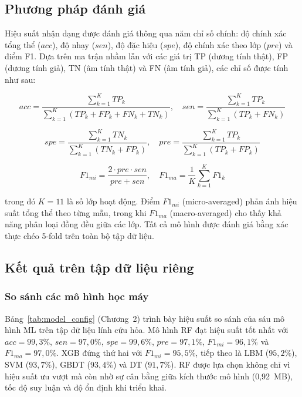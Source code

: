 \label{results_and_discussion}

\subsection{Phương pháp đánh giá}

Hiệu suất nhận dạng được đánh giá thông qua năm chỉ số chính: độ chính xác tổng thể ($acc$), độ nhạy ($sen$), độ đặc hiệu ($spe$), độ chính xác theo lớp ($pre$) và điểm F1. Dựa trên ma trận nhầm lẫn với các giá trị TP (dương tính thật), FP (dương tính giả), TN (âm tính thật) và FN (âm tính giả), các chỉ số được tính như sau:

\begin{equation}
acc = \frac{\sum_{k=1}^{K} TP_k}{\sum_{k=1}^{K} (TP_k + FP_k + FN_k + TN_k)}, \quad
sen = \frac{\sum_{k=1}^{K} TP_k}{\sum_{k=1}^{K} (TP_k + FN_k)}
\end{equation}

\begin{equation}
spe = \frac{\sum_{k=1}^{K} TN_k}{\sum_{k=1}^{K} (TN_k + FP_k)}, \quad
pre = \frac{\sum_{k=1}^{K} TP_k}{\sum_{k=1}^{K} (TP_k + FP_k)}
\end{equation}

\begin{equation}
F1_{mi} = \frac{2 \cdot pre \cdot sen}{pre + sen}, \quad
F1_{ma} = \frac{1}{K} \sum_{k=1}^{K} F1_k
\end{equation}

trong đó $K = 11$ là số lớp hoạt động. Điểm $F1_{mi}$ (micro-averaged) phản ánh hiệu suất tổng thể theo từng mẫu, trong khi $F1_{ma}$ (macro-averaged) cho thấy khả năng phân loại đồng đều giữa các lớp. Tất cả mô hình được đánh giá bằng xác thực chéo 5-fold trên toàn bộ tập dữ liệu.

\subsection{Kết quả trên tập dữ liệu riêng}

\subsubsection{So sánh các mô hình học máy}

Bảng~\ref{tab:model_config} (Chương~2) trình bày hiệu suất so sánh của sáu mô hình ML trên tập dữ liệu lính cứu hỏa. Mô hình RF đạt hiệu suất tốt nhất với $acc = 99{,}3\%$, $sen = 97{,}0\%$, $spe = 99{,}6\%$, $pre = 97{,}1\%$, $F1_{mi} = 96{,}1\%$ và $F1_{ma} = 97{,}0\%$. XGB đứng thứ hai với $F1_{mi} = 95{,}5\%$, tiếp theo là LBM ($95{,}2\%$), SVM ($93{,}7\%$), GBDT ($93{,}4\%$) và DT ($91{,}7\%$). RF được lựa chọn không chỉ vì hiệu suất ưu vượt mà còn nhờ sự cân bằng giữa kích thước mô hình (0,92~MB), tốc độ suy luận và độ ổn định khi triển khai.

